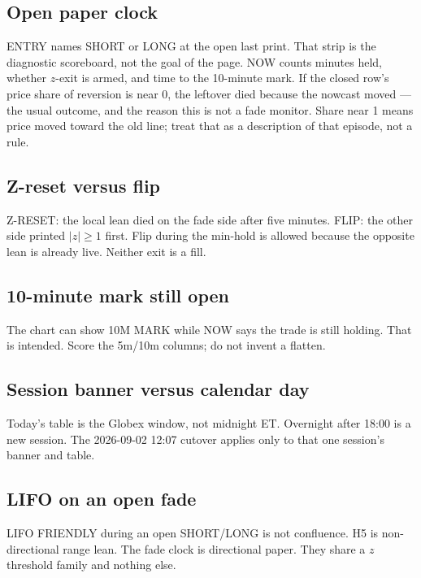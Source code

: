 \documentclass[11pt]{article}
\newcommand{\abs}[1]{\lvert #1 \rvert}
\begin{document}
\subsection{Open paper clock}

ENTRY names SHORT or LONG at the open last print.  That strip is
the diagnostic scoreboard, not the goal of the page.  NOW counts
minutes held, whether \(z\)-exit is armed, and time to the
10-minute mark.  If the closed row's price share of reversion is
near 0, the leftover died because the nowcast moved --- the usual
outcome, and the reason this is not a fade monitor.  Share near 1
means price moved toward the old line; treat that as a description
of that episode, not a rule.

\subsection{Z-reset versus flip}

Z-RESET: the local lean died on the fade side after five minutes.
FLIP: the other side printed \(\abs{z}\ge 1\) first.  Flip during the
min-hold is allowed because the opposite lean is already live.  Neither
exit is a fill.

\subsection{10-minute mark still open}

The chart can show 10M MARK while NOW says the trade is still holding.
That is intended.  Score the 5m/10m columns; do not invent a flatten.

\subsection{Session banner versus calendar day}

Today's table is the Globex window, not midnight ET.  Overnight after
18:00 is a new session.  The 2026-09-02 12:07 cutover applies only to
that one session's banner and table.

\subsection{LIFO on an open fade}

LIFO FRIENDLY during an open SHORT/LONG is not confluence.  H5 is
non-directional range lean.  The fade clock is directional paper.
They share a \(z\) threshold family and nothing else.
\end{document}
